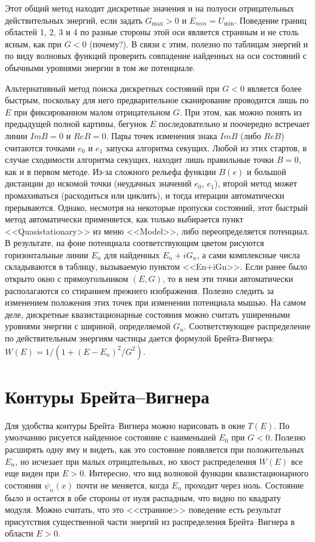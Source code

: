 \documentclass[12pt]{article}
\begin{document}
Этот общий метод находит дискретные значения и на полуоси отрицательных действительных энергий,
если задать $G_{\max}>0$ и $E_{min}=U_{\min}$. Поведение границ областей 1, 2, 3 и 4 по разные стороны этой оси является странным
и не столь ясным, как при $G<0$ (почему?). В связи с этим, полезно по таблицам энергий и по виду волновых функций
проверить совпадение найденных на оси состояний с обычными уровнями энергии в том же потенциале.

Альтернативный метод поиска дискретных состояний при $G<0$ является более быстрым, поскольку для него
предварительное сканирование проводится лишь по $E$ при фиксированном малом отрицательном $G$. При этом, как можно
понять из предыдущей полной картины, бегунок $E$ последовательно и поочередно встречает линии $Im B=0$ и  $Re B=0$.
Пары точек изменения знака $Im B$ (либо $Re B$) считаются точками $e_0$ и $e_1$ запуска алгоритма секущих.
Любой из этих стартов, в случае сходимости алгоритма секущих, находит лишь правильные точки $B=0$, как и в
первом методе. Из-за сложного рельефа функции $B(e)$ и большой дистанции  до искомой точки (неудачных значений $e_0$, $e_1$),
второй метод может промахиваться (расходиться или циклить), и тогда итерации автоматически прерываются. Однако,
несмотря на некоторые пропуски состояний, этот быстрый метод автоматически применяется, как только  выбирается
пункт <<Quasistationary>> из меню <<Model>>, либо переопределяется потенциал. В результате, на фоне потенциала
соответствующим цветом рисуются горизонтальные линии $E_n$ для найденных $E_n+iG_n$, а сами комплексные числа
складываются в таблицу, вызываемую пунктом <<En+iGn>>. Если ранее было открыто окно с прямоугольником $(E,G)$,
то в нем эти точки автоматически располагаются со стиранием прежнего изображения. Полезно следить за изменением
положения этих точек при изменении потенциала мышью.
На самом деле, дискретные квазистационарные состояния можно считать уширенными уровнями энергии с шириной,
определяемой $G_n$. Соответствующее распределение по действительным энергиям частицы дается формулой
Брейта-Вигнера: $W(E)=1/(1+(E-E_n)^2/G^2)$.

\hypertarget{BW}{}\section{Контуры Брейта--Вигнера}
Для удобства контуры Брейта--Вигнера можно нарисовать в окне $T(E)$. По умолчанию рисуется найденное
состояние с наименьшей $E_0$ при $G<0$.  Полезно расширять одну яму и видеть, как это состояние появляется
при положительных $E_n$, но исчезает при малых отрицательных, но хвост распределения $W(E)$ все еще виден при $E>0$.
Интересно, что вид волновой функции квазистационарного состояния $\psi_n(x)$ почти не меняется, когда $E_n$
проходит через ноль. Состояние было и остается в обе стороны от нуля  распадным, что видно по квадрату модуля.
Можно считать, что это <<странное>> поведение есть результат присутствия существенной части энергий из
распределения Брейта--Вигнера в области $E>0$.
\end{document}
